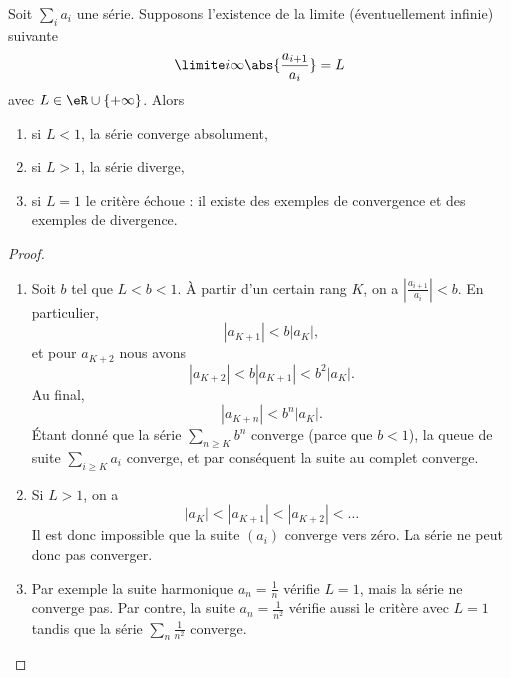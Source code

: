 \begin{proposition}     \label{PropOXKUooQmAaJX}
	Soit \( \sum_i a_i\) une série. Supposons l'existence de la limite (éventuellement infinie) suivante
	\begin{equation}
		\limite i \infty \abs{\frac{a_{i+1}}{a_i}} = L
	\end{equation}
	avec \( L\in \eR\cup\{ +\infty \}\).  Alors
	\begin{enumerate}
		\item si \(L < 1\), la série converge absolument,
		\item si \(L > 1\), la série diverge,
		\item si \(L = 1\) le critère échoue : il existe des exemples de convergence et des exemples de divergence.
	\end{enumerate}
\end{proposition}

\begin{proof}
	\begin{enumerate}
		\item
		      Soit \( b\) tel que \( L<b<1\). À partir d'un certain rang \( K\), on a \( \left| \frac{ a_{i+1} }{ a_i } \right| <b\). En particulier,
		      \begin{equation}
			      | a_{K+1} |<b| a_K |,
		      \end{equation}
		      et pour \( a_{K+2}\) nous avons
		      \begin{equation}
			      | a_{K+2} |<b| a_{K+1} |<b^2| a_K |.
		      \end{equation}
		      Au final,
		      \begin{equation}
			      | a_{K+n} |<b^n| a_K |.
		      \end{equation}
		      Étant donné que la série \( \sum_{n\geq K}b^n\) converge (parce que \( b<1\)), la queue de suite \( \sum_{i\geq K}a_i\) converge, et par conséquent la suite au complet converge.
		\item
		      Si \( L>1\), on a
		      \begin{equation}
			      | a_K |<| a_{K+1} |<| a_{K+2} |<\ldots
		      \end{equation}
		      Il est donc impossible que la suite \( (a_i)\) converge vers zéro. La série ne peut donc pas converger.
		\item
		      Par exemple la suite harmonique \( a_n=\frac{1}{ n }\) vérifie \( L=1\), mais la série ne converge pas. Par contre, la suite \( a_n=\frac{ 1 }{ n^2 }\) vérifie aussi le critère avec \( L=1\) tandis que la série \( \sum_n\frac{1}{ n^2 }\) converge.
	\end{enumerate}
\end{proof}


